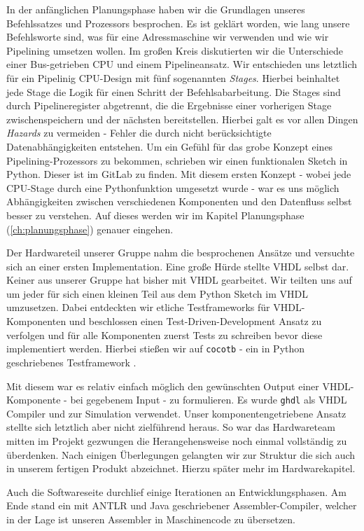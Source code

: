 \documentclass[paper=a4,fontsize=11pt,twocolumn]{scrreprt}
\begin{document}
In der anfänglichen Planungsphase haben wir die Grundlagen unseres Befehlssatzes und Prozessors besprochen.
Es ist geklärt worden, wie lang unsere Befehlsworte sind, was für eine Adressmaschine wir verwenden und wie wir Pipelining umsetzen wollen.
Im großen Kreis diskutierten wir die Unterschiede einer Bus-getrieben CPU und einem Pipelineansatz.
Wir entschieden uns letztlich für ein Pipelinig CPU-Design mit fünf sogenannten \textit{Stages}.
Hierbei beinhaltet jede Stage die Logik für einen Schritt der Befehlsabarbeitung.
Die Stages sind durch Pipelineregister abgetrennt, die die Ergebnisse einer vorherigen Stage zwischenspeichern und der nächsten bereitstellen.
Hierbei galt es vor allen Dingen \textit{Hazards} zu vermeiden - Fehler die durch nicht berücksichtigte Datenabhängigkeiten entstehen.
Um ein Gefühl für das grobe Konzept eines Pipelining-Prozessors zu bekommen, schrieben wir einen funktionalen Sketch in Python.
Dieser ist im GitLab \cite{gitlab_projekt} zu finden.
Mit diesem ersten Konzept - wobei jede CPU-Stage durch eine Pythonfunktion umgesetzt wurde - war es uns möglich Abhängigkeiten zwischen verschiedenen Komponenten und den Datenfluss selbst besser zu verstehen.
Auf dieses werden wir im Kapitel Planungsphase (\ref{ch:planungsphase}) genauer eingehen.

Der Hardwareteil unserer Gruppe nahm die besprochenen Ansätze und versuchte sich an einer ersten Implementation.
Eine große Hürde stellte VHDL selbst dar.
Keiner aus unserer Gruppe hat bisher mit VHDL gearbeitet.
Wir teilten uns auf um jeder für sich einen kleinen Teil aus dem Python Sketch im VHDL umzusetzen.
Dabei entdeckten wir etliche Testframeworks für VHDL-Komponenten und beschlossen einen Test-Driven-Development Ansatz zu verfolgen und für alle Komponenten zuerst Tests zu schreiben bevor diese implementiert werden.
Hierbei stießen wir auf \texttt{cocotb} - ein in Python geschriebenes Testframework \autocite{cocotb}.

Mit diesem war es relativ einfach möglich den gewünschten Output einer VHDL-Komponente - bei gegebenem Input - zu formulieren.
Es wurde \texttt{ghdl} als VHDL Compiler und zur Simulation verwendet.
Unser komponentengetriebene Ansatz stellte sich letztlich aber nicht zielführend heraus.
So war das Hardwareteam mitten im Projekt gezwungen die Herangehensweise noch einmal vollständig zu überdenken.
Nach einigen Überlegungen gelangten wir zur Struktur die sich auch in unserem fertigen Produkt abzeichnet.
Hierzu später mehr im Hardwarekapitel.

Auch die Softwareseite durchlief einige Iterationen an Entwicklungsphasen.
Am Ende stand ein mit ANTLR und Java geschriebener Assembler-Compiler, welcher in der Lage ist unseren Assembler in Maschinencode zu übersetzen.
\end{document}
